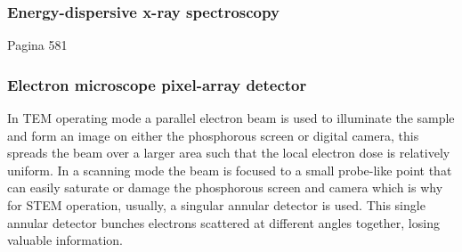 \subsubsection{Energy-dispersive x-ray spectroscopy}
Pagina 581


\subsubsection{Electron microscope pixel-array detector}
In TEM operating mode a parallel electron beam is used to illuminate the sample and form an image on either the phosphorous screen or digital camera, this spreads the beam over a larger area such that the local electron dose is relatively uniform. In a scanning mode the beam is focused to a small probe-like point that can easily saturate or damage the phosphorous screen and camera which is why for STEM operation, usually, a singular annular detector is used. This single annular detector bunches electrons scattered at different angles together, losing valuable information.


